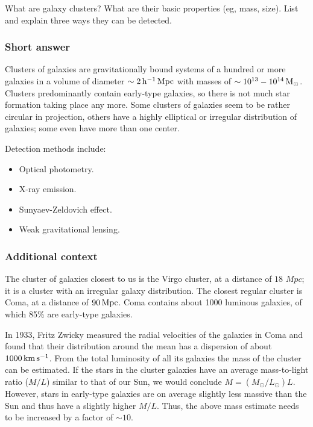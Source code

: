 \documentclass[a4paper,11pt]{article}
\begin{document}
What are galaxy clusters? What are their basic properties (eg, mass, size). List and explain three ways they can be detected.

\subsubsection{Short answer}

Clusters of galaxies are gravitationally bound systems of a hundred or more galaxies in a volume of diameter $\sim2\,{\rm h^{-1}\,Mpc}$ with masses of $\sim10^{13}-10^{14}\,{\rm M_\odot}$. Clusters predominantly contain early-type galaxies, so there is not much star formation taking place any more. Some clusters of galaxies seem to be rather circular in projection, others have a highly elliptical or irregular distribution of galaxies; some even have more than one center.

{\noindent}Detection methods include:

\begin{itemize}
    \item Optical photometry.
    \item X-ray emission. 
    \item Sunyaev-Zeldovich effect.
    \item Weak gravitational lensing. 
\end{itemize}

\subsubsection{Additional context}

The cluster of galaxies closest to us is the Virgo cluster, at a distance of $18\,{\, Mpc}$; it is a cluster with an irregular galaxy distribution. The closest regular cluster is Coma, at a distance of $90\,{\rm Mpc}$. Coma contains about 1000 luminous galaxies, of which 85\% are early-type galaxies.

{\noindent}In 1933, Fritz Zwicky measured the radial velocities of the galaxies in Coma and found that their distribution around the mean has a dispersion of about $1000\,{\rm km\,s^{-1}}$. From the total luminosity of all its galaxies the mass of the cluster can be estimated. If the stars in the cluster galaxies have an average mass-to-light ratio ($M/L$) similar to that of our Sun, we would conclude $M=(M_\odot/L_\odot)L$. However, stars in early-type galaxies are on average slightly less massive than the Sun and thus have a slightly higher $M/L$. Thus, the above mass estimate needs to be increased by a factor of $\sim10$.
\end{document}
